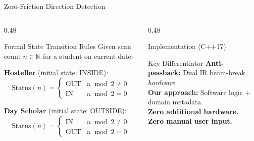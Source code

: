 \documentclass[aspectratio=169, 11pt]{beamer}
\begin{document}
\begin{frame}{Zero-Friction Direction Detection}
  \begin{columns}[T]
    \begin{column}{0.48\textwidth}
      \begin{block}{Formal State Transition Rules}
        \small
        Given scan count $n \in \mathbb{N}$ for a student on current date:
        \vspace{0.2em}

        \textbf{Hosteller} (initial state: INSIDE):
        \[
          \text{Status}(n) = \begin{cases}
            \text{OUT} & n \bmod 2 \neq 0 \\
            \text{IN}  & n \bmod 2 = 0
          \end{cases}
        \]

        \textbf{Day Scholar} (initial state: OUTSIDE):
        \[
          \text{Status}(n) = \begin{cases}
            \text{IN}  & n \bmod 2 \neq 0 \\
            \text{OUT} & n \bmod 2 = 0
          \end{cases}
        \]
      \end{block}
    \end{column}
    \begin{column}{0.48\textwidth}
      \begin{exampleblock}{Implementation (C++17)}
        
      \end{exampleblock}
      \vspace{0.2em}
      \begin{block}{Key Differentiator}
        \small
        \textbf{Anti-passback:} Dual IR beam-break \textit{hardware}.\\[0.15em]
        \textbf{Our approach:} Software logic + domain metadata.\\[0.15em]
        \textcolor{CodeGreen}{\faCheckCircle} \textbf{Zero additional hardware.}\\
        \textcolor{CodeGreen}{\faCheckCircle} \textbf{Zero manual user input.}
      \end{block}
    \end{column}
  \end{columns}
\end{frame}

\end{document}
